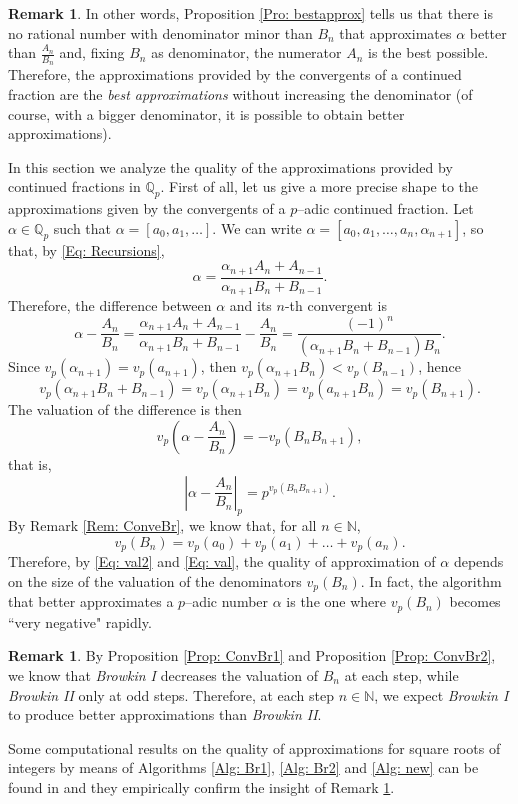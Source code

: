 \documentclass[12pt, reqno]{amsart}
\theoremstyle{plain}
\theoremstyle{definition}
\newtheorem{Remark}[Theorem]{Remark}
\begin{document}
\begin{Remark}
In other words, Proposition \ref{Pro: bestapprox} tells us that there is no rational number with denominator minor than $B_n$ that approximates $\alpha$ better than $\frac{A_n}{B_n}$ and, fixing $B_n$ as denominator, the numerator $A_n$ is the best possible. Therefore, the approximations provided by the convergents of a continued fraction are the \textit{best approximations} without increasing the denominator (of course, with a bigger denominator, it is possible to obtain better approximations). 
\end{Remark}

In this section we analyze the quality of the approximations provided by continued fractions in $\mathbb{Q}_p$. First of all, let us give a more precise shape to the approximations given by the convergents of a $p$--adic continued fraction. Let $\alpha\in\mathbb{Q}_p$ such that $\alpha = [a_0, a_1, \ldots]$. We can write $\alpha=[a_0,a_1,\ldots,a_n,\alpha_{n+1}]$, so that, by \eqref{Eq: Recursions},
\[\alpha=\frac{\alpha_{n+1}A_n+A_{n-1}}{\alpha_{n+1}B_n+B_{n-1}}.\]
Therefore, the difference between $\alpha$ and its $n$-th convergent is
\[\alpha-\frac{A_n}{B_n}=\frac{\alpha_{n+1}A_n+A_{n-1}}{\alpha_{n+1}B_n+B_{n-1}}-\frac{A_n}{B_n}=\frac{(-1)^n}{(\alpha_{n+1}B_n+B_{n-1})B_n}.\]
Since $v_p(\alpha_{n+1})=v_p(a_{n+1})$, then $v_p(\alpha_{n+1}B_n)<v_p(B_{n-1})$, hence
\[v_p(\alpha_{n+1}B_n+B_{n-1})=v_p(\alpha_{n+1}B_n)=v_p(a_{n+1}B_n)=v_p(B_{n+1}).\] The valuation of the difference is then
\begin{equation}\label{Eq: val2}
v_p\left(\alpha-\frac{A_n}{B_n}\right)=-v_p(B_{n}B_{n+1}),
\end{equation}
that is, 
\begin{equation}\label{Eq: val}
\left|\alpha-\frac{A_n}{B_n}\right|_p=p^{v_p(B_nB_{n+1})}.
\end{equation}
By Remark \ref{Rem: ConveBr}, we know that, for all $n\in\mathbb{N}$,
\[v_p(B_n)=v_p(a_0)+v_p(a_1)+\ldots+v_p(a_n).\]
Therefore, by \eqref{Eq: val2} and \eqref{Eq: val}, the quality of approximation of $\alpha$ depends on the size of the valuation of the denominators $v_p(B_n)$. In fact, the algorithm that better approximates a $p$--adic number $\alpha$ is the one where $v_p(B_n)$ becomes ``very negative" rapidly.
\begin{Remark}\label{Rem: appbrow}
By Proposition \ref{Prop: ConvBr1} and Proposition \ref{Prop: ConvBr2}, we know that \textit{Browkin I} decreases the valuation of $B_n$ at each step, while \textit{Browkin II} only at odd steps. Therefore, at each step $n\in\mathbb{N}$, we expect \textit{Browkin I} to produce better approximations than \textit{Browkin II}.
\end{Remark}
Some computational results on the quality of approximations for square roots of integers by means of Algorithms \eqref{Alg: Br1}, \eqref{Alg: Br2} and \eqref{Alg: new} can be found in \cite{MR} and they empirically confirm the insight of Remark \ref{Rem: appbrow}.\\
\end{document}
